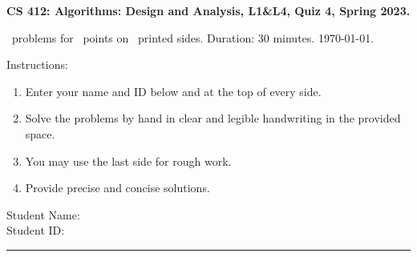\documentclass[addpoints,a4paper]{exam}
\begin{document}
\begin{flushleft}
  { \large \textsf{\textbf{CS 412: Algorithms: Design and Analysis, L1\&L4, Quiz 4, Spring 2023.}}}\vspace{.5em}
  
  \numquestions\ problems for \numpoints\ points on \numpages\ printed sides. Duration: 30 minutes. \today.
\end{flushleft}

Instructions:
\begin{enumerate}
\item Enter your name and ID below and at the top of every side.
\item Solve the problems by hand in clear and legible handwriting in the provided space.
\item You may use the last side for rough work.
\item Provide precise and concise solutions.
\end{enumerate}

\noindent Student Name: \hrulefill \\[5pt]
\noindent Student ID: \hrulefill \\
\rule{\textwidth}{1pt}
\end{document}
